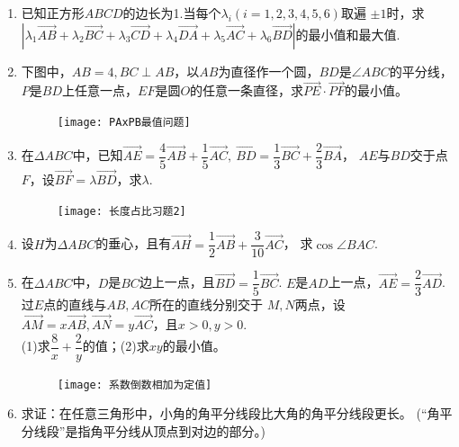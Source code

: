 \begin{enumerate}[label={\textbf{\arabic*.}},leftmargin=
    \inteval{\myenumleftmargin}pt]
\item 已知正方形$ ABCD $的边长为1.当每个$ \lambda_i(i=1,2,3,4,5,6) $取遍
$ \pm 1 $时，求\\ $|\lambda_1\vec{AB}+\lambda_2\vec{BC}+\lambda_3
\vec{CD}+\lambda_4\vec{DA}+\lambda_5 \vec{AC}+\lambda_6\vec{BD}| 
$的最小值和最大值.

\item 下图中，$ AB=4,BC \perp AB $，以$ AB $为直径作一个圆，$ BD $是$ \angle ABC $的平分线，$ P $是$ BD $上任意一点，$ EF $是圆$ O $的任意一条直径，求$ \vec{PE}\cdot \vec{PF} $的最小值。
\begin{figure}[h]
    \centering
    \texttt{[image: PAxPB最值问题]}
\end{figure}

\item 在$ \Delta ABC $中，已知$ \vec{AE}=\dfrac{4}{5}
\vec{AB}+\dfrac{1}{5}\vec{AC},\ \vec{BD}=
\dfrac{1}{3}\vec{BC}+\dfrac{2}{3}\vec{BA} $，
$ AE $与$ BD $交于点$ F $，设$ \vec{BF}=\lambda 
\vec{BD} $，求$ \lambda $. 
\begin{figure}[h]
    \centering
    \texttt{[image: 长度占比习题2]}
\end{figure}

\item 设$ H $为$ \Delta ABC $的垂心，且有$ \vec{AH}=
\dfrac{1}{2}\vec{AB}+\dfrac{3}{10}\vec{AC} $，
求$ \cos \angle BAC $. 

\item 在$ \Delta ABC $中，$ D $是$ BC $边上一点，且$ \vec{BD}=
\dfrac{1}{5}\vec{BC} $. $ E $是$ AD $上一点，$ \vec{AE} =
\dfrac{2}{3}\vec{AD} $. 过$ E $点的直线与$ AB,AC $所在的直线分别交于
$ M,N $两点，设$ \vec{AM}=x\vec{AB},\vec{AN}=
y\vec{AC} $，且$ x>0,y>0 $. \\
(1)求$ \dfrac{8}{x}+\dfrac{2}{y} $的值；(2)求$ xy $的最小值。
\begin{figure}[!htbp]
    \centering
    \texttt{[image: 系数倒数相加为定值]}
\end{figure} 

\item 求证：在任意三角形中，小角的角平分线段比大角的角平分线段更长。
(“角平分线段”是指角平分线从顶点到对边的部分。)

\end{enumerate}

